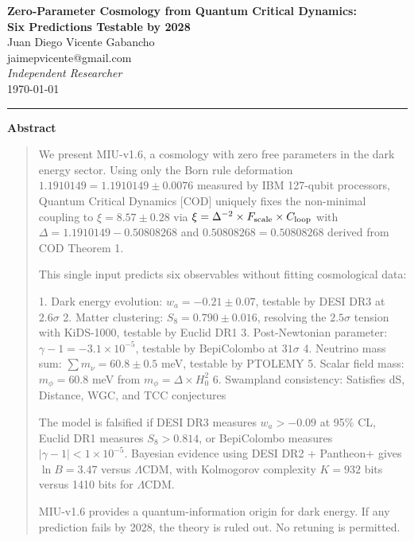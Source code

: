 \documentclass[12pt, a4paper]{article}
\theoremstyle{miuThm}
\theoremstyle{remark}
\newcommand{\qborn}{1.1910149}
\newcommand{\qcrit}{0.50808268}
\begin{document}
\begin{center}
  \vspace*{0.3cm}
  {\LARGE\bfseries Zero-Parameter Cosmology from Quantum Critical Dynamics:\\[5pt]
   Six Predictions Testable by 2028}\\[1.2em]
  {\large Juan Diego Vicente Gabancho}\\[0.3em]
  {\normalsize\ttfamily jaimepvicente@gmail.com}\\[0.15em]
  {\normalsize\itshape Independent Researcher}\\[0.5em]
  {\normalsize\today}\\[0.5em]
  \noindent\rule{0.85\linewidth}{0.4pt}
\end{center}

\bigskip
{\centering\bfseries Abstract\par}
\smallskip
\begin{quote}
\small
We present MIU-v1.6, a cosmology with zero free parameters in the dark energy sector.
Using only the Born rule deformation $\qborn = 1.1910149 \pm 0.0076$ measured by 
IBM 127-qubit processors, Quantum Critical Dynamics [COD] uniquely fixes the 
non-minimal coupling to $\xi = 8.57 \pm 0.28$ via $\xi = \Delta^{-2} \times 
F_{\rm scale} \times C_{\rm loop}$ with $\Delta = \qborn - \qcrit$ and 
$\qcrit = 0.50808268$ derived from COD Theorem 1.

This single input predicts six observables without fitting cosmological data:

1. Dark energy evolution: $w_a = -0.21 \pm 0.07$, testable by DESI DR3 at $2.6\sigma$
2. Matter clustering: $S_8 = 0.790 \pm 0.016$, resolving the $2.5\sigma$ tension 
   with KiDS-1000, testable by Euclid DR1
3. Post-Newtonian parameter: $\gamma - 1 = -3.1 \times 10^{-5}$, testable by 
   BepiColombo at $31\sigma$
4. Neutrino mass sum: $\sum m_\nu = 60.8 \pm 0.5$ meV, testable by PTOLEMY
5. Scalar field mass: $m_\phi = 60.8$ meV from $m_\phi = \Delta \times H_0^2$
6. Swampland consistency: Satisfies dS, Distance, WGC, and TCC conjectures

The model is falsified if DESI DR3 measures $w_a > -0.09$ at 95\% CL, Euclid DR1 
measures $S_8 > 0.814$, or BepiColombo measures $|\gamma-1| < 1 \times 10^{-5}$. 
Bayesian evidence using DESI DR2 + Pantheon+ gives $\ln B = 3.47$ versus 
$\Lambda$CDM, with Kolmogorov complexity $K = 932$ bits versus 1410 bits for 
$\Lambda$CDM.

MIU-v1.6 provides a quantum-information origin for dark energy. If any prediction 
fails by 2028, the theory is ruled out. No retuning is permitted.
\end{quote}
\end{document}
